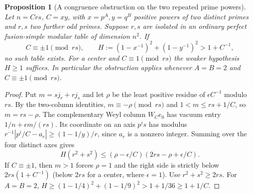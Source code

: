 \documentclass[11pt,a4paper]{article}
\numberwithin{equation}{section}
\newtheorem{proposition}[theorem]{Proposition}
\theoremstyle{remark}
\begin{document}
\begin{proposition}[A congruence obstruction on the two repeated prime powers]\label{fam:M:8.6}
Let $n=Crs$, $C=xy$, with $x=p^A,y=q^B$ positive powers of two
distinct primes and $r,s$ two further odd primes. Suppose $r,s$ are
isolated in an ordinary perfect fusion-simple modular table of
dimension $n^2$. If
\[
 C\equiv\pm1\pmod{rs},\qquad
 H:=(1-x^{-1})^2+(1-y^{-1})^2>1+C^{-1},
\]
no such table exists. For a center and $C\equiv1\pmod{rs}$ the
weaker hypothesis $H\ge1$ suffices. In particular the obstruction
applies whenever $A=B=2$ and $C\equiv\pm1\pmod{rs}$.
\end{proposition}
\begin{proof}
Put $m=sj_r+rj_s$ and let $\rho$ be the least positive residue of
$\epsilon C^{-1}$ modulo $rs$. By the two-column identities,
$m\equiv-\rho\pmod{rs}$ and $1<m\le rs+1/C$, so $m=rs-\rho$.
The complementary Weyl column $W_Ce_0$ has vacuum entry
$1/n+\epsilon m/(rs)$. Its coordinate on an axis $p^is$ has modulus
$r^{-1}|p^i/C-a_r|\ge(1-1/y)/r$, since $a_r$ is a nonzero integer.
Summing over the four distinct axes gives
\[
 H(r^2+s^2)\le(\rho-\epsilon/C)(2rs-\rho+\epsilon/C).
\]
If $C\equiv\pm1$, then $m>1$ forces $\rho=1$ and the right side
is strictly below $2rs(1+C^{-1})$ (below $2rs$ for a center, where
$\epsilon=1$). Use $r^2+s^2\ge2rs$. For $A=B=2$,
$H\ge(1-1/4)^2+(1-1/9)^2>1+1/36\ge1+1/C$.
\end{proof}
\end{document}
